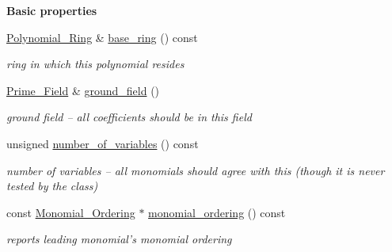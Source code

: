 \begin{Indent}\textbf{ Basic properties}\par
\begin{DoxyCompactItemize}
\item 
\mbox{\label{group__polygroup_abf1f531c0004bf37874e98eee42dc0f4}} 
\hyperlink{group__polygroup_class_polynomial___ring}{Polynomial\+\_\+\+Ring} \& \hyperlink{group__polygroup_abf1f531c0004bf37874e98eee42dc0f4}{base\+\_\+ring} () const
\begin{DoxyCompactList}\small\item\em ring in which this polynomial resides \end{DoxyCompactList}\item 
\mbox{\label{group__polygroup_a5bd4f2c1ef7a4f090afd6cd55bc2604f}} 
\hyperlink{group___fields_group_class_prime___field}{Prime\+\_\+\+Field} \& \hyperlink{group__polygroup_a5bd4f2c1ef7a4f090afd6cd55bc2604f}{ground\+\_\+field} ()
\begin{DoxyCompactList}\small\item\em ground field -- all coefficients should be in this field \end{DoxyCompactList}\item 
\mbox{\label{group__polygroup_a4419bbe47e14683f2903c47bee8e04af}} 
unsigned \hyperlink{group__polygroup_a4419bbe47e14683f2903c47bee8e04af}{number\+\_\+of\+\_\+variables} () const
\begin{DoxyCompactList}\small\item\em number of variables -- all monomials should agree with this (though it is never tested by the class) \end{DoxyCompactList}\item 
\mbox{\label{group__polygroup_a36a3b3b5132246f9e916b91d8d5a1c76}} 
const \hyperlink{group__orderinggroup_class_monomial___ordering}{Monomial\+\_\+\+Ordering} $\ast$ \hyperlink{group__polygroup_a36a3b3b5132246f9e916b91d8d5a1c76}{monomial\+\_\+ordering} () const
\begin{DoxyCompactList}\small\item\em reports leading monomial's monomial ordering \end{DoxyCompactList}\item 
\mbox{\label{group__polygroup_a9186ed0f55c5cc4ecb1b9bc11ba9f679}} 

\end{DoxyCompactItemize}
\end{Indent}
